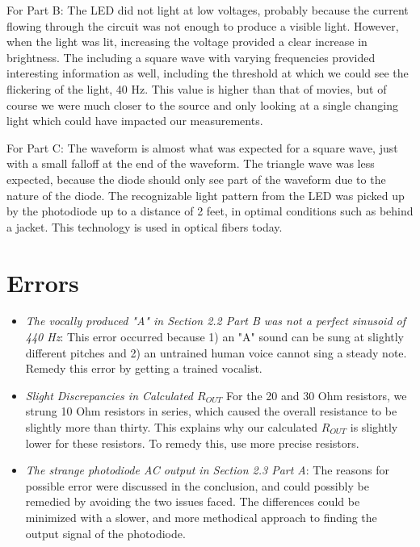 \documentclass[10pt]{article}
\begin{document}
For Part B: The LED did not light at low voltages, probably because the current flowing through the circuit was not enough to produce a visible light. However, when the light was lit, increasing the voltage provided a clear increase in brightness. The including a square wave with varying frequencies provided interesting information as well, including the threshold at which we could see the flickering of the light, 40 Hz. This value is higher than that of movies, but of course we were much closer to the source and only looking at a single changing light which could have impacted our measurements. 

For Part C: The waveform is almost what was expected for a square wave, just with a small falloff at the end of the waveform. The triangle wave was less expected, because the diode should only see part of the waveform due to the nature of the diode. The recognizable light pattern from the LED was picked up by the photodiode up to a distance of 2 feet, in optimal conditions such as behind a jacket. This technology is used in optical fibers today.

\medskip

\section{Errors}
\begin{itemize}
	\item \textit{The vocally produced "A" in Section 2.2 Part B was not a perfect sinusoid of 440 Hz}: This error occurred because 1) an "A" sound can be sung at slightly different pitches and 2) an untrained human voice cannot sing a steady note. Remedy this error by getting a trained vocalist. 
	\item \textit{Slight Discrepancies in Calculated $R_{OUT}$} For the 20 and 30 Ohm resistors, we strung 10 Ohm resistors in series, which caused the overall resistance to be slightly more than thirty. This explains why our calculated $R_{OUT}$ is slightly lower for these resistors. To remedy this, use more precise resistors. 
	\item \textit{The strange photodiode AC output in Section 2.3 Part A}: The reasons for possible error were discussed in the conclusion, and could possibly be remedied by avoiding the two issues faced. The differences could be minimized with a slower, and more methodical approach to finding the output signal of the photodiode. 
\end{itemize}


\medskip

\
\end{document}
